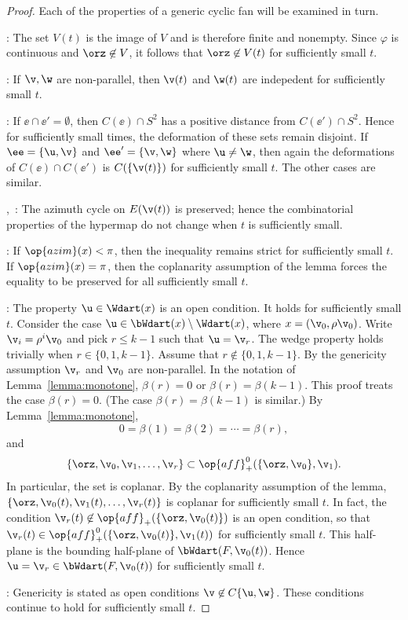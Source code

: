 \begin{proof} Each of the properties of a generic cyclic fan will be
examined in turn.

: The set $V(t)$ is the image of $V$ and is therefore finite
and nonempty.   Since $\varphi$ is continuous and
$\orz\not\in V$, it follows that $\orz\not\in V(t)$ for sufficiently
small $t$.

: If $\v,\w$ are non-parallel, then $\v(t)$ and
$\w(t)$ are indepedent for sufficiently small $t$.

: If $\ee \cap \ee'=\emptyset$, then $C(\ee)\cap
S^2$ has a positive distance from $C(\ee')\cap S^2$.  Hence for
sufficiently small times, the deformation of these sets remain
disjoint.  If $\ee=\{\u,\v\}$ and $\ee'=\{\v,\w\}$ where $\u\ne\w$,
then again the deformations of $C(\ee)\cap C(\ee')$ is
$C(\{\v(t)\})$ for sufficiently small $t$.  The other cases are
similar.

,~: The azimuth cycle on $E(\v(t))$
is preserved; hence the combinatorial properties of the hypermap do
not change when $t$ is sufficiently small.

: If $\op{azim}(x)<\pi$, then the inequality remains
strict for sufficiently small $t$.  If $\op{azim}(x)=\pi$, then the
coplanarity assumption of the lemma forces the equality to be
preserved for all sufficiently small $t$.

: The property $\u\in \Wdart(x)$ is an open condition.
It holds for sufficiently small $t$. Consider the case $\u\in
\bWdart(x)\setminus \Wdart(x)$, where $x= (\v_0,\rho\v_0)$.  Write
$\v_i = \rho^i\v_0$ and pick $r\le k-1$ such that $\u = \v_r$.  The
wedge property holds trivially when $r\in\{0,1,k-1\}$. Assume that
$r\not\in\{0,1,k-1\}$.  By the genericity assumption $\v_r$ and
$\v_0$ are non-parallel.  In the notation of
Lemma~\ref{lemma:monotone}, $\beta(r) = 0$ or $\beta(r) =
\beta(k-1)$.  This proof treats the case $\beta(r)=0$. (The case
$\beta(r)=\beta(k-1)$ is similar.)  By Lemma~\ref{lemma:monotone},
\begin{displaymath}0=\beta(1)=\beta(2)=\cdots=\beta(r),\end{displaymath}
and 
\begin{displaymath}
\{\orz,\v_0,\v_1,\ldots,\v_r\} \subset \op{aff}^0_+(\{\orz,\v_0\},\v_1).
\end{displaymath}
In particular, the set is coplanar.  By the coplanarity assumption of
the lemma, $\{\orz,\v_0(t),\v_1(t),\ldots,\v_r(t)\}$ is coplanar for
sufficiently small $t$.  In fact, the condition $\v_r(t)\not\in
\op{aff}_+(\{\orz,\v_0(t)\})$ is an open condition, so that
$\v_r(t)\in \op{aff}^0_+(\{\orz,\v_0(t)\},\v_1(t))$ for sufficiently
small $t$.  This half-plane is the bounding half-plane of
$\bWdart(F,\v_0(t))$.  Hence $\u = \v_r\in \bWdart(F,\v_0(t))$ for
sufficiently small $t$.

: Genericity is stated as open conditions $\v\not\in
C\{\u,\w\}$.  These conditions continue to hold for sufficiently small
$t$.
\end{proof}


